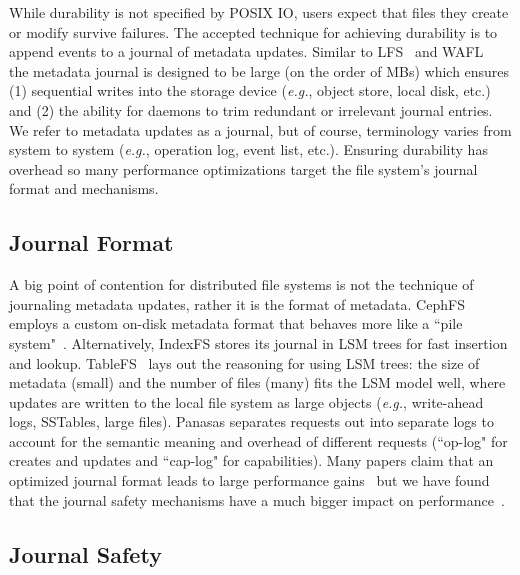 While durability is not specified by POSIX IO, users expect that files they
create or modify survive failures. The accepted technique for achieving
durability is to append events to a journal of metadata updates.  Similar to
LFS~\cite{rosenblum:acm1992-LFS} and WAFL~\cite{hitz:wtec1994-WAFL} the
metadata journal is designed to be large (on the order of MBs) which ensures
(1) sequential writes into the storage device ({\it e.g.}, object store, local
disk, etc.) and (2) the ability for daemons to trim redundant or irrelevant
journal entries. We refer to metadata updates as a journal, but of course,
terminology varies from system to system ({\it e.g.}, operation log, event
list, etc.). Ensuring durability has overhead so many performance optimizations
target the file system's journal format and mechanisms.

\subsection{Journal Format}

A big point of contention for distributed file systems is not the technique of
journaling metadata updates, rather it is the format of metadata. CephFS
employs a custom on-disk metadata format that behaves more like a ``pile
system"~\cite{weil:phdthesis07}. Alternatively, IndexFS stores its journal in
LSM trees for fast insertion and lookup.  TableFS~\cite{ren:atc2013-tablefs}
lays out the reasoning for using LSM trees: the size of metadata (small) and
the number of files (many) fits the LSM model well, where updates are written
to the local file system as large objects ({\it e.g.}, write-ahead logs,
SSTables, large files). Panasas separates requests out into separate logs to
account for the semantic meaning and overhead of different requests (``op-log"
for creates and updates and ``cap-log" for capabilities).  Many papers claim
that an optimized journal format leads to large performance
gains~\cite{ren:atc2013-tablefs, ren:sc2014-indexfs, zheng:pdsw2014-batchfs}
but we have found that the journal safety mechanisms have a much bigger impact
on performance~\cite{sevilla:ipdps18-cudele}.

\subsection{Journal Safety}

